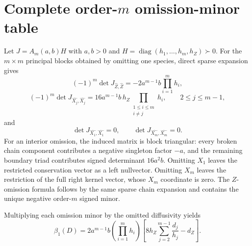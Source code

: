 \section*{Complete order-$m$ omission-minor table}
Let $J=A_m(a,b)H$ with $a,b>0$ and $H=\operatorname{diag}(h_1,\ldots,h_m,h_Z)
\succ0$.  For the $m\times m$ principal blocks obtained by omitting one
species, direct sparse expansion gives
\[
(-1)^m\det J_{\widehat Z,\widehat Z}
=-2a^{m-1}b\prod_{i=1}^{m}h_i,
\]
\[
(-1)^m\det J_{\widehat {X_j},\widehat {X_j}}
=16a^{m-1}b\,h_Z\!\prod_{\substack{1\le i\le m\\i\ne j}}h_i,
\qquad 2\le j\le m-1,
\]
and
\[
\det J_{\widehat {X_1},\widehat {X_1}}=0,
\qquad
\det J_{\widehat {X_m},\widehat {X_m}}=0.
\]
For an interior omission, the induced matrix is block triangular: every broken
chain component contributes a negative singleton factor $-a$, and the remaining
boundary triad contributes signed determinant $16a^2b$.  Omitting $X_1$ leaves
the restricted conservation vector as a left nullvector.  Omitting $X_m$ leaves
the restriction of the full right kernel vector, whose $X_m$ coordinate is
zero.  The $Z$-omission formula follows by the same sparse chain expansion and
contains the unique negative order-$m$ signed minor.

Multiplying each omission minor by the omitted diffusivity yields
\[
\boxed{
\beta_1(D)=2a^{m-1}b\left(\prod_{i=1}^{m}h_i\right)
\left[8h_Z\sum_{j=2}^{m-1}\frac{d_j}{h_j}-d_Z\right].}
\]
